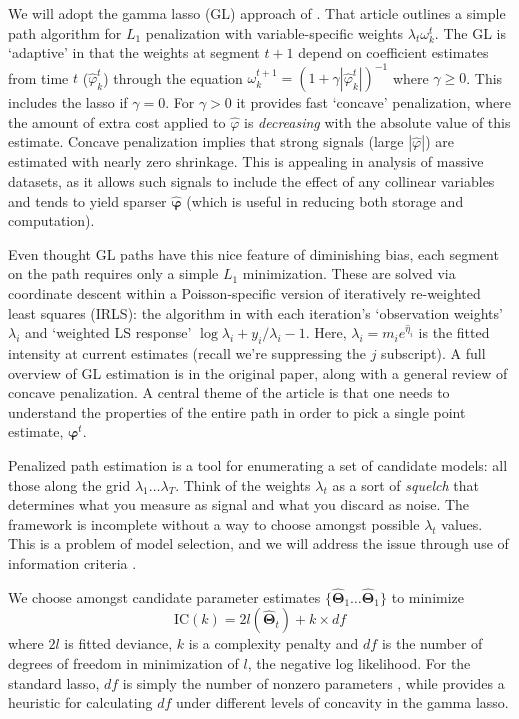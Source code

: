 \documentclass[12pt]{article}
\newcommand{\bs}[1]{\boldsymbol{#1}}
\begin{document}
We will adopt the gamma lasso (GL) approach of
\citet{taddy_gamma_2013}.  That article outlines a simple path
algorithm for $L_1$ penalization with  variable-specific weights $\lambda_t
\omega^t_{k}$.  The GL is `adaptive' in that the  weights at segment
$t+1$ depend on coefficient estimates from time $t$ ($\hat \varphi^t_k$)
through the equation $\omega^{t+1}_k  = \left(1 + \gamma
|\hat\varphi^t_k|\right)^{-1}$ where $\gamma \geq 0$.  This includes the
 lasso if $\gamma=0$.  For $\gamma>0$ it provides fast
`concave' penalization, where  the amount of extra cost applied to
$\hat \varphi$ is {\it decreasing} with the absolute value of this estimate.
Concave penalization implies that strong signals (large $|\hat
\varphi|$) are estimated with nearly zero shrinkage. This is appealing in
analysis of massive datasets, as it allows such signals to include the
effect of any collinear variables and tends to yield sparser $\bs{\hat
\varphi}$ (which is useful in reducing both storage and computation).

Even thought GL paths have this nice feature of diminishing bias, each segment
on the path requires only a simple $L_1$ minimization.  These are solved via
coordinate descent within a Poisson-specific version of iteratively re-weighted least squares (IRLS): the
algorithm in \citet[Section 6]{taddy_gamma_2013} with each iteration's
`observation weights' $\lambda_i$ and `weighted LS response' $\log\lambda_i +
y_i/\lambda_i - 1$.  Here, $\lambda_i = m_ie^{\hat\eta_i}$ is the fitted
intensity at current estimates (recall we're suppressing the $j$  subscript).
A full overview of GL estimation is in the original paper, along with a
general review of concave penalization.  A central theme of the article is
that  one needs to understand the properties of the entire path in order to
pick a single point estimate, $\bs{\varphi}^t$.

Penalized path estimation is a tool for enumerating a set of candidate models:
all those along the grid $\lambda_1 \ldots \lambda_T$.  Think of the weights
$\lambda_t$ as a sort of {\it squelch} that determines what you measure as
signal and what you discard as noise.  The framework is incomplete
without  a way to choose amongst possible $\lambda_t$ values.  This is  a
problem of model selection, and we will address the issue through use of
information criteria \citep[IC; e.g.,][]{efron_estimation_2004}.  

We choose amongst  candidate
parameter estimates $\{\bs{\hat\Theta}_1 \ldots \bs{\hat\Theta}_1 \}$ to
minimize \begin{equation}\label{cp} \text{IC}(k) = 2l(\bs{\hat\Theta}_t ) +
k\times df \end{equation} where $2l$ is fitted deviance,   $k$ is a complexity
penalty and $df$ is the number of degrees of freedom in minimization of $l$,
the negative log likelihood.   For the standard lasso, $df$ is simply the
number of nonzero parameters \citep{zou_degrees_2007}, while
\cite{taddy_gamma_2013} provides a heuristic for calculating $df$ under
different levels of concavity in the gamma lasso.
\end{document}
